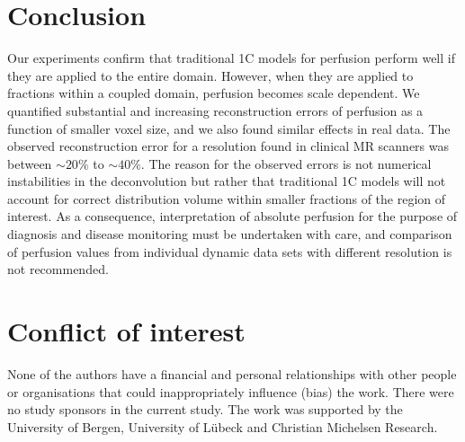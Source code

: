 \documentclass[aps,prb,article,groupedaddress,showkeys]{revtex4}
\begin{document}
	\section{Conclusion}
	Our experiments confirm that traditional 1C models for perfusion perform well if they are applied to the entire domain.
	However, when they are applied to fractions within a coupled domain, perfusion becomes scale dependent.
	We quantified substantial and increasing reconstruction errors of perfusion as a function of smaller voxel size, and we also found similar effects in real data. The observed reconstruction error for a resolution found in clinical MR scanners was between $\sim$$20\%$ to $\sim$$40\%$. The reason for the observed errors is not numerical instabilities in the deconvolution but rather that traditional 1C models will not account for correct distribution volume within smaller fractions of the region of interest. As a consequence, interpretation of absolute perfusion for the purpose of diagnosis and disease monitoring must be undertaken with care, and comparison of perfusion values from individual dynamic data sets with different resolution is not recommended. 

\section*{Conflict of interest}
None of the authors have a financial and personal relationships with other people or organisations that could inappropriately influence (bias) the work.
There were no study sponsors in the current study. The work was supported by the University of Bergen, University of L\"ubeck and Christian Michelsen Research.




% 
	
\end{document}
